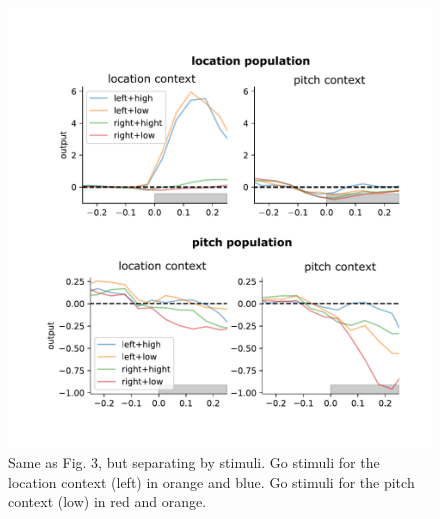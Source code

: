 \documentclass[12pt]{article}
\begin{document}
\begin{figure}
\centering
        \includegraphics[width=\textwidth]{figures/FigS3.pdf}
    \caption{Same as Fig. 3, but separating by stimuli. Go stimuli for the location context (left) in orange and blue. Go stimuli for the pitch context (low) in red and orange.} 
    \label{figS3}
\end{figure}
\end{document}
